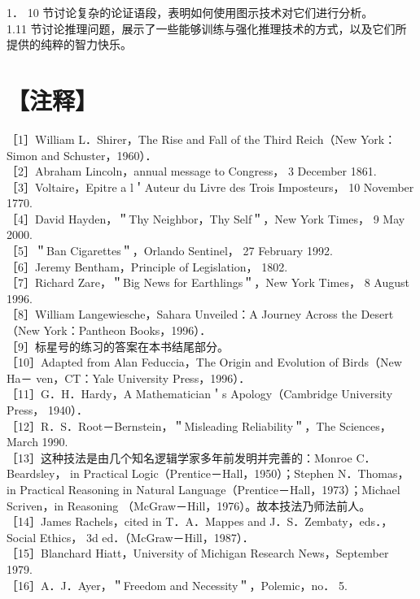 1． 10 节讨论复杂的论证语段，表明如何使用图示技术对它们进行分析。\\
1.11 节讨论推理问题，展示了一些能够训练与强化推理技术的方式，以及它们所提供的纯粹的智力快乐。

\section*{【注释】}
［1］William L．Shirer，The Rise and Fall of the Third Reich（New York：Simon and Schuster，1960）．\\
［2］Abraham Lincoln，annual message to Congress， 3 December 1861.\\
［3］Voltaire，Epitre a l＇Auteur du Livre des Trois Imposteurs， 10 November\\
1770.\\
［4］David Hayden，＂Thy Neighbor，Thy Self＂，New York Times， 9 May 2000.\\
［5］＂Ban Cigarettes＂，Orlando Sentinel， 27 February 1992.\\
［6］Jeremy Bentham，Principle of Legislation， 1802.\\
［7］Richard Zare，＂Big News for Earthlings＂，New York Times， 8 August 1996.\\
［8］William Langewiesche，Sahara Unveiled：A Journey Across the Desert（New York：Pantheon Books，1996）．\\
［9］标星号的练习的答案在本书结尾部分。\\
［10］Adapted from Alan Feduccia，The Origin and Evolution of Birds（New Ha－ ven，CT：Yale University Press，1996）．\\
［11］G．H．Hardy，A Mathematician＇s Apology（Cambridge University Press， 1940）．\\
［12］R．S．Root－Bernstein，＂Misleading Reliability＂，The Sciences，March 1990.\\
［13］这种技法是由几个知名逻辑学家多年前发明并完善的：Monroe C．Beardsley， in Practical Logic（Prentice－Hall，1950）；Stephen N．Thomas，in Practical Reasoning in Natural Language（Prentice－Hall，1973）；Michael Scriven，in Reasoning （McGraw－Hill，1976）。故本技法乃师法前人。\\
［14］James Rachels，cited in T．A．Mappes and J．S．Zembaty，eds．，Social Ethics， 3d ed．（McGraw－Hill，1987）．\\
［15］Blanchard Hiatt，University of Michigan Research News，September 1979.\\
［16］A．J．Ayer，＂Freedom and Necessity＂，Polemic，no． 5.\\
